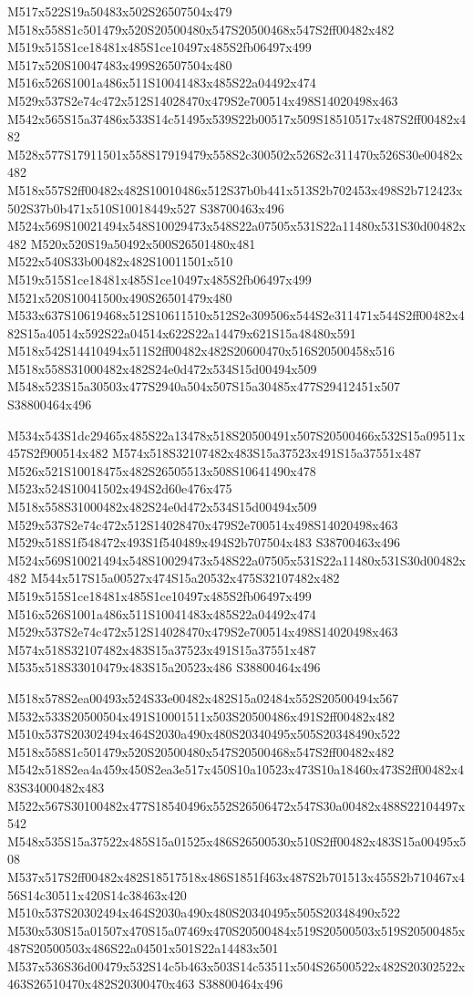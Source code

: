 \documentclass{article}
\begin{document}
\begin{multicols}{2}
M517x522S19a50483x502S26507504x479 M518x558S1c501479x520S20500480x547S20500468x547S2ff00482x482 M519x515S1ce18481x485S1ce10497x485S2fb06497x499 M517x520S10047483x499S26507504x480 M516x526S1001a486x511S10041483x485S22a04492x474 M529x537S2e74c472x512S14028470x479S2e700514x498S14020498x463 M542x565S15a37486x533S14c51495x539S22b00517x509S18510517x487S2ff00482x482 M528x577S17911501x558S17919479x558S2c300502x526S2c311470x526S30e00482x482 M518x557S2ff00482x482S10010486x512S37b0b441x513S2b702453x498S2b712423x502S37b0b471x510S10018449x527 S38700463x496 M524x569S10021494x548S10029473x548S22a07505x531S22a11480x531S30d00482x482 M520x520S19a50492x500S26501480x481 M522x540S33b00482x482S10011501x510 M519x515S1ce18481x485S1ce10497x485S2fb06497x499 M521x520S10041500x490S26501479x480 M533x637S10619468x512S10611510x512S2e309506x544S2e311471x544S2ff00482x482S15a40514x592S22a04514x622S22a14479x621S15a48480x591 M518x542S14410494x511S2ff00482x482S20600470x516S20500458x516 M518x558S31000482x482S24e0d472x534S15d00494x509 M548x523S15a30503x477S2940a504x507S15a30485x477S29412451x507 S38800464x496

M534x543S1dc29465x485S22a13478x518S20500491x507S20500466x532S15a09511x457S2f900514x482 M574x518S32107482x483S15a37523x491S15a37551x487 M526x521S10018475x482S26505513x508S10641490x478 M523x524S10041502x494S2d60e476x475 M518x558S31000482x482S24e0d472x534S15d00494x509 M529x537S2e74c472x512S14028470x479S2e700514x498S14020498x463 M529x518S1f548472x493S1f540489x494S2b707504x483 S38700463x496 M524x569S10021494x548S10029473x548S22a07505x531S22a11480x531S30d00482x482 M544x517S15a00527x474S15a20532x475S32107482x482 M519x515S1ce18481x485S1ce10497x485S2fb06497x499 M516x526S1001a486x511S10041483x485S22a04492x474 M529x537S2e74c472x512S14028470x479S2e700514x498S14020498x463 M574x518S32107482x483S15a37523x491S15a37551x487 M535x518S33010479x483S15a20523x486 S38800464x496

M518x578S2ea00493x524S33e00482x482S15a02484x552S20500494x567 M532x533S20500504x491S10001511x503S20500486x491S2ff00482x482 M510x537S20302494x464S2030a490x480S20340495x505S20348490x522 M518x558S1c501479x520S20500480x547S20500468x547S2ff00482x482 M542x518S2ea4a459x450S2ea3e517x450S10a10523x473S10a18460x473S2ff00482x483S34000482x483 M522x567S30100482x477S18540496x552S26506472x547S30a00482x488S22104497x542 M548x535S15a37522x485S15a01525x486S26500530x510S2ff00482x483S15a00495x508 M537x517S2ff00482x482S18517518x486S1851f463x487S2b701513x455S2b710467x456S14c30511x420S14c38463x420 M510x537S20302494x464S2030a490x480S20340495x505S20348490x522 M530x530S15a01507x470S15a07469x470S20500484x519S20500503x519S20500485x487S20500503x486S22a04501x501S22a14483x501 M537x536S36d00479x532S14c5b463x503S14c53511x504S26500522x482S20302522x463S26510470x482S20300470x463 S38800464x496


\end{multicols}
\end{document}
